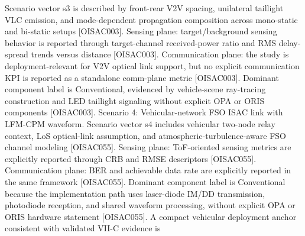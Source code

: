{}Scenario vector s3 is described by front-rear V2V spacing, unilateral taillight VLC emission, and mode-dependent propagation composition across mono-static and bi-static setups [O\markdownRendererUnderscore{}ISAC\markdownRendererUnderscore{}003]. Sensing plane: target/background sensing behavior is reported through target-channel received-power ratio and RMS delay-spread trends versus distance [O\markdownRendererUnderscore{}ISAC\markdownRendererUnderscore{}003]. Communication plane: the study is deployment-relevant for V2V optical link support, but no explicit communication KPI is reported as a standalone comm-plane metric [O\markdownRendererUnderscore{}ISAC\markdownRendererUnderscore{}003]. Dominant component label is Conventional, evidenced by vehicle-scene ray-tracing construction and LED taillight signaling without explicit OPA or ORIS components [O\markdownRendererUnderscore{}ISAC\markdownRendererUnderscore{}003].\markdownRendererParagraphSeparator
{}Scenario 4: Vehicular-network FSO ISAC link with LFM-CPM waveform.\markdownRendererHardLineBreak
{}Scenario vector s4 includes vehicular two-node relay context, LoS optical-link assumption, and atmospheric-turbulence-aware FSO channel modeling [O\markdownRendererUnderscore{}ISAC\markdownRendererUnderscore{}055]. Sensing plane: ToF-oriented sensing metrics are explicitly reported through CRB and RMSE descriptors [O\markdownRendererUnderscore{}ISAC\markdownRendererUnderscore{}055]. Communication plane: BER and achievable data rate are explicitly reported in the same framework [O\markdownRendererUnderscore{}ISAC\markdownRendererUnderscore{}055]. Dominant component label is Conventional because the implementation path uses laser-diode IM/DD transmission, photodiode reception, and shared waveform processing, without explicit OPA or ORIS hardware statement [O\markdownRendererUnderscore{}ISAC\markdownRendererUnderscore{}055].\markdownRendererInterblockSeparator
{}
\markdownRendererSectionEnd \markdownRendererSectionBegin
{}\markdownRendererInterblockSeparator
{}A compact vehicular deployment anchor consistent with validated VII-C evidence is\markdownRendererInterblockSeparator
{}\markdownRendererInterblockSeparator
{}\markdownRendererInterblockSeparator
